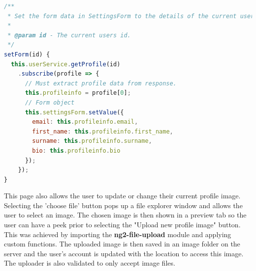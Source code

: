 \begin{lstlisting}[language=JavaScript,caption={Auto fill form data},captionpos=b,label={fig:userscema}]
/**
 * Set the form data in SettingsForm to the details of the current user.
 * 
 * @param id - The current users id.
 */
setForm(id) {
  this.userService.getProfile(id)
    .subscribe(profile => {
      // Must extract profile data from response.
      this.profileinfo = profile[0];
      // Form object
      this.settingsForm.setValue({
        email: this.profileinfo.email,
        first_name: this.profileinfo.first_name,
        surname: this.profileinfo.surname,
        bio: this.profileinfo.bio
      });
    });
}
\end{lstlisting}
 This page also allows the user to update or change their current profile image. Selecting the 'choose file' button pops up a file explorer window and allows the user to select an image. The chosen image is then shown in a preview tab so the user can have a peek prior to selecting the "Upload new profile image" button. This was achieved by importing the \textbf{ng2-file-upload} module and applying custom functions. The uploaded image is then saved in an image folder on the server and the user's account is updated with the location to access this image. The uploader is also validated to only accept image files.
